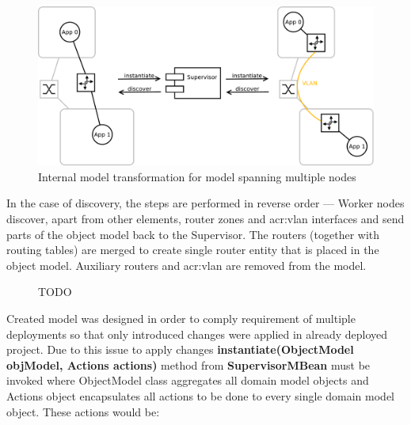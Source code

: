 \documentclass[11pt]{book}
\begin{document}
          \begin{figure}[H]
            \centering
            \includegraphics[width=.9\textwidth]{img/test-case/router.pdf}

            \caption{Internal model transformation for model spanning multiple nodes}
            \label{fig:impl:router}
          
          \end{figure}

          In the case of discovery, the steps are performed in reverse order --- Worker nodes discover, apart from other
          elements, router zones and \gls{acr:vlan} interfaces and send parts of the object model back to the
          Supervisor. The routers (together with routing tables) are merged to create single router entity that is
          placed in the object model. Auxiliary routers and \gls{acr:vlan} are removed from the model.

          \begin{figure}[H]

            \centering

            \caption{TODO}
            \label{fig:impl:transformation}
          
          \end{figure}

        

        Created model was designed in order to comply requirement of multiple deployments so that only introduced
        changes were applied in already deployed project. Due to this issue to apply changes
        \textbf{instantiate(ObjectModel objModel, Actions actions)} method from \textbf{SupervisorMBean} must be invoked
        where ObjectModel class aggregates all domain model objects and Actions object encapsulates all actions to be
        done to every single domain model object. These actions would be:
\end{document}
